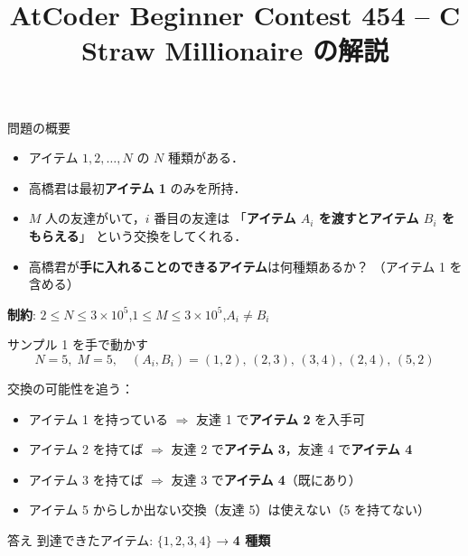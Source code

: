 \documentclass[dvipdfmx,aspectratio=169]{beamer}
\title{AtCoder Beginner Contest 454 -- C\\\small Straw Millionaire の解説}
\author{}
\date{}
\begin{document}
\begin{frame}
  \titlepage
\end{frame}

\begin{frame}{問題の概要}
  \begin{itemize}
    \item アイテム $1, 2, \ldots, N$ の $N$ 種類がある．
    \item 高橋君は最初\textbf{アイテム 1} のみを所持．
    \item $M$ 人の友達がいて，$i$ 番目の友達は
      「\textbf{アイテム $A_i$ を渡すとアイテム $B_i$ をもらえる}」
      という交換をしてくれる．
    \item 高橋君が\textbf{手に入れることのできるアイテム}は何種類あるか？
      （アイテム 1 を含める）
  \end{itemize}

  \vspace{0.8em}
  \textbf{制約}: $2 \le N \le 3 \times 10^5$,\quad $1 \le M \le 3 \times 10^5$,\quad $A_i \ne B_i$
\end{frame}

\begin{frame}{サンプル 1 を手で動かす}
  \[
    N=5,\; M=5,\quad
    (A_i, B_i) = (1,2),\,(2,3),\,(3,4),\,(2,4),\,(5,2)
  \]

  \vspace{0.6em}
  交換の可能性を追う：
  \begin{itemize}
    \item アイテム 1 を持っている $\Rightarrow$ 友達 1 で\textbf{アイテム 2} を入手可
    \item アイテム 2 を持てば $\Rightarrow$ 友達 2 で\textbf{アイテム 3}，友達 4 で\textbf{アイテム 4}
    \item アイテム 3 を持てば $\Rightarrow$ 友達 3 で\textbf{アイテム 4}（既にあり）
    \item アイテム 5 からしか出ない交換（友達 5）は使えない（5 を持てない）
  \end{itemize}

  \vspace{0.6em}
  \begin{alertblock}{答え}
    到達できたアイテム: $\{1, 2, 3, 4\}$ → \textbf{4 種類}
  \end{alertblock}
\end{frame}
\end{document}
